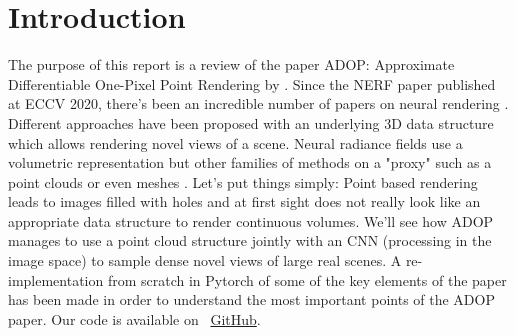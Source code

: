 \section{Introduction}
\label{sec:intro}
The purpose of this report is a review of the paper ADOP: Approximate Differentiable One-Pixel Point Rendering by \citet{ruckert2022adop}. 
Since the NERF paper published at ECCV 2020, there's been an incredible number of papers on neural rendering . Different approaches have been proposed with an underlying 3D data structure which allows rendering novel views of a scene. Neural radiance fields use a volumetric representation but other families of methods on a "proxy" such as a point clouds \cite{Aliev2020} or even meshes \cite{worchel2022nds}.
Let's put things simply: Point based rendering leads to images filled with holes and at first sight does not really look like an appropriate data structure to render continuous volumes.
We'll see how ADOP manages to use a point cloud structure jointly with an CNN (processing in the image space) to sample dense novel views of large real scenes.
A re-implementation from scratch in Pytorch of some of the key elements of the paper has been made in order to understand the most important points of the ADOP paper.
Our code is available on ~\href{https://github.com/balthazarneveu/per-pixel-point-rendering}{GitHub}.
